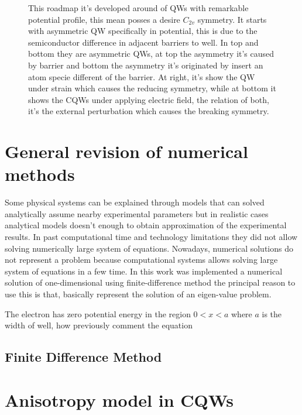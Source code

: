 \begin{figure}
{		This roadmap it's developed around of QWs with remarkable potential profile, this mean posses a desire $C_{2v}$ symmetry. It starts with asymmetric QW  specifically in potential, this is  due to the semiconductor difference in adjacent barriers to well. In top and bottom they are asymmetric QWs, at top the asymmetry it's caused by barrier and bottom the asymmetry it's originated by insert an atom specie different of the barrier. At right, it's show the QW under strain which causes the reducing symmetry, while at bottom it shows the CQWs under applying electric field, the relation of both, it's the external perturbation which causes the breaking symmetry. 
	}
	\label{fig:subsubsec:chapter-2-special-symmetry--roadmap}
\end{figure}





















\newpage
\section{General revision of numerical methods}
Some physical systems can be explained through models that can solved analytically assume nearby experimental parameters but in realistic cases analytical models doesn't enough to obtain approximation of the experimental results. In past computational time and technology limitations they did not allow solving numerically large system of equations.  Nowadays, numerical solutions do not represent a problem because computational systems  allows solving large system of equations in  
a few time. In this work was implemented  a numerical solution of one-dimensional \sch using finite-difference method the principal reason to use this is that, basically represent the solution of an eigen-value problem. 






The electron has zero potential energy in the region $0<x<a$ where $a$ is the width of well, how previously comment the \sch equation 



\subsection{Finite Difference Method}






\section{Anisotropy model in CQWs \label{sub:chap2-anisotropy-model}}

